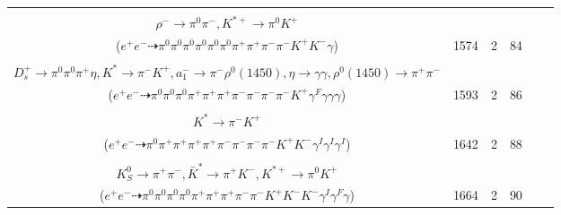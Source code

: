 \documentclass[landscape]{article}
\newcounter{rownumbers}
\newcommand\rn{\stepcounter{rownumbers}\arabic{rownumbers}}
\newcommand{\EOLP}{\\ \hline} %
\newcommand{\topoTags}[1]{#1} %
\begin{document}
\begin{longtable}{clcccc}
\rn & \makecell[l]{ $ 
e^{+} e^{-} \rightarrow \pi^{0} \rho^{-} D^{*+} \bar{D}^{*0} ,
\rho^{-} \rightarrow \pi^{0} \pi^{-} ,
D^{*+} \rightarrow \pi^{+} D^{0} ,
\bar{D}^{*0} \rightarrow \pi^{0} \bar{D}^{0} ,
D^{0} \rightarrow \pi^{0} \pi^{+} K^{-} ,
\bar{D}^{0} \rightarrow \rho^{-} K^{*+} \gamma ,
$ \\ $
\rho^{-} \rightarrow \pi^{0} \pi^{-} ,
K^{*+} \rightarrow \pi^{0} K^{+} 
$ \\ ($
e^{+} e^{-} \dashrightarrow \pi^{0} \pi^{0} \pi^{0} \pi^{0} \pi^{0} \pi^{0} \pi^{+} \pi^{+} \pi^{-} \pi^{-} K^{+} K^{-} \gamma 
$) } & \topoTags{1574 & }2 & 84 \EOLP

\rn & \makecell[l]{ $ 
e^{+} e^{-} \rightarrow \bar{K}^{0} D^{*-} D_{s}^{*+} ,
\bar{K}^{0} \rightarrow K_{S}^{0} ,
D^{*-} \rightarrow \pi^{0} D^{-} ,
D_{s}^{*+} \rightarrow D_{s}^{+} \gamma ,
K_{S}^{0} \rightarrow \pi^{+} \pi^{-} \gamma^{F} ,
D^{-} \rightarrow K^{*} a_{1}^{-} ,
$ \\ $
D_{s}^{+} \rightarrow \pi^{0} \pi^{0} \pi^{+} \eta ,
K^{*} \rightarrow \pi^{-} K^{+} ,
a_{1}^{-} \rightarrow \pi^{-} \rho^{0}(1450) ,
\eta \rightarrow \gamma \gamma ,
\rho^{0}(1450) \rightarrow \pi^{+} \pi^{-} 
$ \\ ($
e^{+} e^{-} \dashrightarrow \pi^{0} \pi^{0} \pi^{0} \pi^{+} \pi^{+} \pi^{+} \pi^{-} \pi^{-} \pi^{-} \pi^{-} K^{+} \gamma^{F} \gamma \gamma \gamma 
$) } & \topoTags{1593 & }2 & 86 \EOLP

\rn & \makecell[l]{ $ 
e^{+} e^{-} \rightarrow \pi^{+} \pi^{-} D^{+} D^{*-} \gamma^{I} \gamma^{I} \gamma^{I} ,
D^{+} \rightarrow \pi^{0} \pi^{+} \bar{K}^{*} ,
D^{*-} \rightarrow \pi^{-} \bar{D}^{0} ,
\bar{K}^{*} \rightarrow \pi^{+} K^{-} ,
\bar{D}^{0} \rightarrow \rho^{0} K^{*} ,
\rho^{0} \rightarrow \pi^{+} \pi^{-} ,
$ \\ $
K^{*} \rightarrow \pi^{-} K^{+} 
$ \\ ($
e^{+} e^{-} \dashrightarrow \pi^{0} \pi^{+} \pi^{+} \pi^{+} \pi^{+} \pi^{-} \pi^{-} \pi^{-} \pi^{-} K^{+} K^{-} \gamma^{I} \gamma^{I} \gamma^{I} 
$) } & \topoTags{1642 & }2 & 88 \EOLP

\rn & \makecell[l]{ $ 
e^{+} e^{-} \rightarrow \pi^{-} \bar{K}^{*} \bar{D}^{*0} D_{s}^{*+} \gamma^{I} ,
\bar{K}^{*} \rightarrow \pi^{+} K^{-} \gamma^{F} ,
\bar{D}^{*0} \rightarrow \pi^{0} \bar{D}^{0} ,
D_{s}^{*+} \rightarrow D_{s}^{+} \gamma ,
\bar{D}^{0} \rightarrow \pi^{0} \pi^{0} K_{S}^{0} ,
D_{s}^{+} \rightarrow \bar{K}^{*} K^{*+} ,
$ \\ $
K_{S}^{0} \rightarrow \pi^{+} \pi^{-} ,
\bar{K}^{*} \rightarrow \pi^{+} K^{-} ,
K^{*+} \rightarrow \pi^{0} K^{+} 
$ \\ ($
e^{+} e^{-} \dashrightarrow \pi^{0} \pi^{0} \pi^{0} \pi^{0} \pi^{+} \pi^{+} \pi^{+} \pi^{-} \pi^{-} K^{+} K^{-} K^{-} \gamma^{I} \gamma^{F} \gamma 
$) } & \topoTags{1664 & }2 & 90 \EOLP


\end{longtable}
\end{document}
